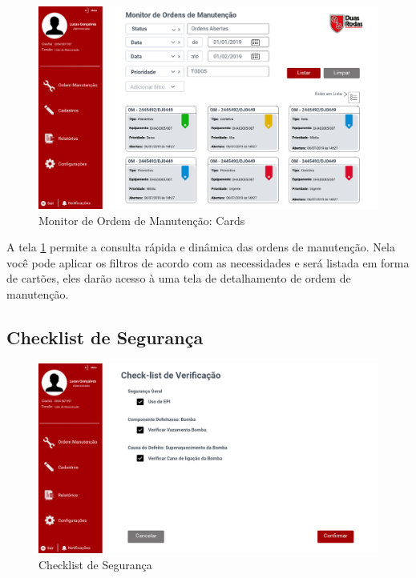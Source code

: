 \begin{figure}[H]
	\caption{\label{web_monitor-om-card}Monitor de Ordem de Manutenção: Cards}
	\begin{center}
		\includegraphics[scale=0.45]{./Figuras/web/monitor-om-card.png}
	\end{center}
\end{figure}

A tela \ref{web_monitor-om-card} permite a consulta rápida e dinâmica das ordens de manutenção. Nela você pode aplicar os filtros de acordo com as necessidades e será listada em forma de cartões, eles darão acesso à uma tela de detalhamento de ordem de manutenção.

\subsection{Checklist de Segurança}

\begin{figure}[H]
	\caption{\label{web_check-list}Checklist de Segurança}
	\begin{center}
		\includegraphics[scale=0.45]{./Figuras/web/check-list.png}
	\end{center}
\end{figure}


